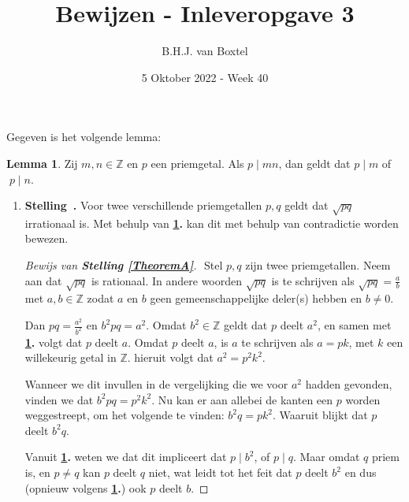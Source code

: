 \documentclass[12pt, dutch, a4paper]{article}
\theoremstyle{definition}
\newtheorem{lemmalos}{Lemma}
\newenvironment{shortthm}
  {\refstepcounter{theorem}\textbf{Stelling~\thetheorem.}}%
{\enskip}
\begin{document}
\title{Bewijzen - Inleveropgave 3}
\author{B.H.J. van Boxtel}
\date{5 Oktober 2022 - Week 40} 

\maketitle
{} 

Gegeven is het volgende lemma:
\begin{lemmalos}\label{lemma1}
    Zij $m,n \in \mathbb{Z}$ en $p$ een priemgetal. Als $p \mid mn$, 
    dan geldt dat $p \mid m$ of $\; p \mid n$.
\end{lemmalos}

\begin{enumerate}[(a.)]
    \item
    \begin{shortthm}\label{TheoremA}
        Voor twee verschillende priemgetallen $p,q$ geldt dat $\sqrt{pq}$ irrationaal is.
    \end{shortthm}
    Met behulp van \textbf{\cref{lemma1}.} kan dit met behulp van contradictie worden bewezen.
    \begin{proof}[Bewijs van \textbf{Stelling \ref{TheoremA}}] $ $ \newline
        Stel $p,q$ zijn twee priemgetallen. \newline
        Neem aan dat $\sqrt{pq}$ is rationaal.
        In andere woorden $\sqrt{pq}$ is te schrijven als $\sqrt{pq} = \tfrac{a}{b}$ 
        met $a,b \in \mathbb{Z}$ zodat $a$ en $b$ 
        geen gemeenschappelijke deler(s) hebben en $b \neq 0$.

        Dan $pq = \tfrac{a^2}{b^2}$ en $b^2pq = a^2$. \newline
        Omdat $b^2 \in \mathbb{Z}$ geldt dat $p$ deelt $a^2$, 
        en samen met \textbf{\cref{lemma1}.} volgt dat $p$ deelt $a$. \newline 
        Omdat $p$ deelt $a$, is $a$ te schrijven als 
        $a = pk$, met $k$ een willekeurig getal in $\mathbb{Z}$.
        hieruit volgt dat $a^2 = p^2k^2$.

        Wanneer we dit invullen in de vergelijking die we voor $a^2$ hadden gevonden, 
        vinden we dat $b^2pq = p^2k^2$. 
        Nu kan er aan allebei de kanten een $p$ worden weggestreept, 
        om het volgende te vinden: $b^2q = pk^2$. Waaruit blijkt dat $p$ deelt $b^2q$.

        Vanuit \textbf{\cref{lemma1}.} weten we dat dit impliceert dat $p \mid b^2$, 
        of $p \mid q$. Maar omdat $q$ priem is, en $p \neq q$ kan $p$ deelt $q$ niet,
        wat leidt tot het feit dat $p$ deelt $b^2$ 
        en dus (opnieuw volgens \textbf{\cref{lemma1}.}) ook $p$ deelt $b$.


\end{proof}
\end{enumerate}
\end{document}
